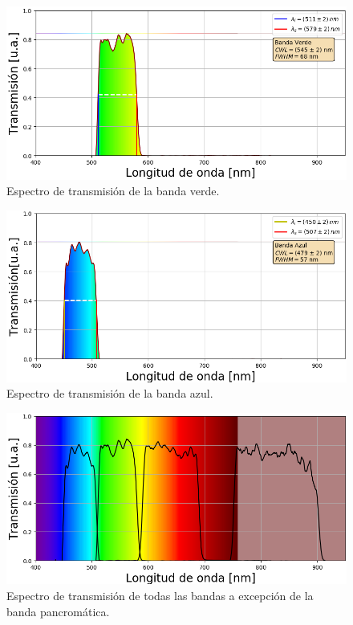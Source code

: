\begin{figure}[H]
	\centering
	\includegraphics[width=1.0\textwidth]{Figs/microespectrometro/espectro_verdet.png}
	\caption{Espectro de transmisión de la banda verde.}
	\label{fig:bverde}
\end{figure}
\begin{figure}[H]
	\centering
	\includegraphics[width=1.0\textwidth]{Figs/microespectrometro/espectro_azult.png}
	\caption{Espectro de transmisión de la banda azul.}
	\label{fig:bazul}
\end{figure}

 \begin{figure}[H]
	\centering
	\includegraphics[width=1.0\textwidth]{Figs/microespectrometro/4bandas_conimshowT.png}
	\caption{Espectro de transmisión de todas las bandas a excepción de la banda pancromática.}
	\label{fig:batod}
\end{figure}

